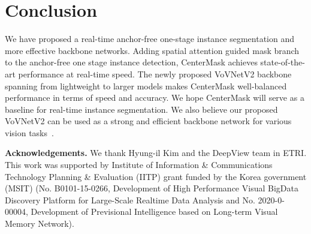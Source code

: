 \documentclass[10pt,twocolumn,letterpaper]{article}
\begin{document}
\section{Conclusion}
We have proposed a real-time anchor-free one-stage instance segmentation and more effective backbone networks.
Adding spatial attention guided mask branch to the anchor-free one stage instance detection, CenterMask achieves state-of-the-art performance at real-time speed.
The newly proposed VoVNetV2 backbone spanning from lightweight to larger models makes CenterMask well-balanced performance in terms of speed and accuracy. 
We hope CenterMask will serve as a baseline for real-time instance segmentation. 
We also believe our proposed VoVNetV2 can be used as a strong and efficient backbone network for various vision tasks~\cite{yun2019vision,jo2019sc}.


\noindent
\textbf{Acknowledgements.}
We thank Hyung-il Kim and the DeepView team in ETRI.
This work was supported by Institute of Information \& Communications Technology Planning \& Evaluation (IITP) grant funded by
the Korea government (MSIT) (No. B0101-15-0266, Development of High Performance Visual BigData Discovery Platform for
Large-Scale Realtime Data Analysis and No. 2020-0-00004, Development of Previsional Intelligence based on Long-term Visual Memory
Network).


{\small


}
\end{document}
